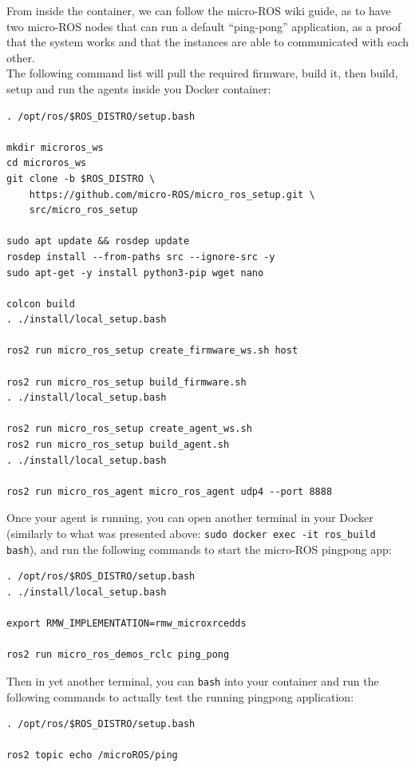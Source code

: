 \documentclass[10pt]{article}
\begin{document}
From inside the container, we can follow the micro-ROS wiki guide, as to have two micro-ROS nodes that can run a default ``ping-pong'' application, as a proof that the system works and that the instances are able to communicated with each other.\\
The following command list will pull the required firmware, build it, then build, setup and run the agents inside you Docker container:
\begin{tcolorbox}
\begin{verbatim}
. /opt/ros/$ROS_DISTRO/setup.bash

mkdir microros_ws
cd microros_ws
git clone -b $ROS_DISTRO \
    https://github.com/micro-ROS/micro_ros_setup.git \
    src/micro_ros_setup

sudo apt update && rosdep update
rosdep install --from-paths src --ignore-src -y
sudo apt-get -y install python3-pip wget nano

colcon build
. ./install/local_setup.bash

ros2 run micro_ros_setup create_firmware_ws.sh host

ros2 run micro_ros_setup build_firmware.sh
. ./install/local_setup.bash

ros2 run micro_ros_setup create_agent_ws.sh
ros2 run micro_ros_setup build_agent.sh
. ./install/local_setup.bash

ros2 run micro_ros_agent micro_ros_agent udp4 --port 8888
\end{verbatim}
\end{tcolorbox}

Once your agent is running, you can open another terminal in your Docker (similarly to what was presented above: \verb|sudo docker exec -it ros_build bash|), and run the following commands to start the micro-ROS pingpong app:
\begin{tcolorbox}
\begin{verbatim}
. /opt/ros/$ROS_DISTRO/setup.bash
. ./install/local_setup.bash

export RMW_IMPLEMENTATION=rmw_microxrcedds

ros2 run micro_ros_demos_rclc ping_pong
\end{verbatim}
\end{tcolorbox}

Then in yet another terminal, you can \verb|bash| into your container and run the following commands to actually test the running pingpong application:
\begin{tcolorbox}
\begin{verbatim}
. /opt/ros/$ROS_DISTRO/setup.bash

ros2 topic echo /microROS/ping
\end{verbatim}
\end{tcolorbox}
\end{document}
